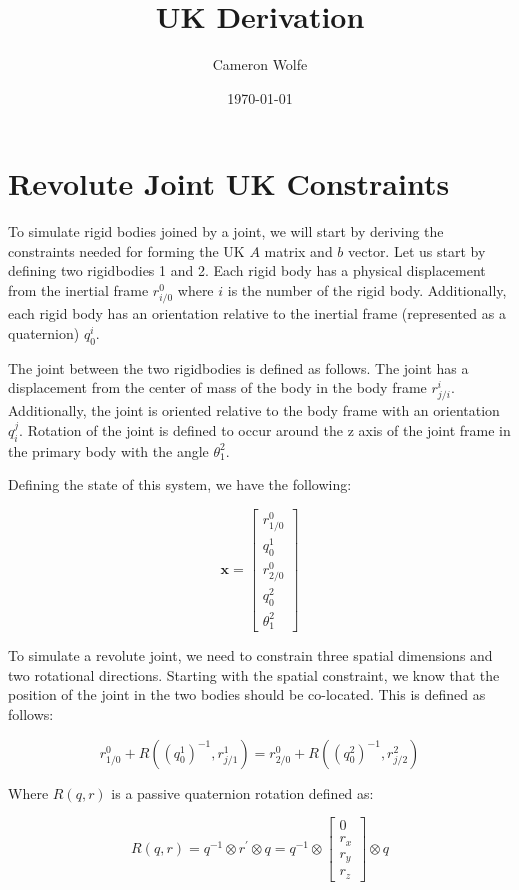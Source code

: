 \documentclass{article}
\title{UK Derivation}
\author{Cameron Wolfe}
\date{\today}
\begin{document}
\section{Revolute Joint UK Constraints}

To simulate rigid bodies joined by a joint, we will start by deriving the constraints needed for forming the UK $A$ matrix and $b$ vector.  Let us start by defining two rigidbodies 1 and 2.  Each rigid body has a physical displacement from the inertial frame $r_{i/0}^0$ where $i$ is the number of the rigid body.  Additionally, each rigid body has an orientation relative to the inertial frame (represented as a quaternion) $q_0^i$.

The joint between the two rigidbodies is defined as follows.  The joint has a displacement from the center of mass of the body in the body frame $r_{j/i}^i$.  Additionally, the joint is oriented relative to the body frame with an orientation $q_i^j$.  Rotation of the joint is defined to occur around the z axis of the joint frame in the primary body with the angle $\theta^2_1$.

Defining the state of this system, we have the following:

\begin{equation}
    \mathbf{x} = \begin{bmatrix}
        r_{1/0}^0 \\
        q_0^1 \\
        r_{2/0}^0 \\
        q_0^2 \\
        \theta_1^2
    \end{bmatrix}
\end{equation}

To simulate a revolute joint, we need to constrain three spatial dimensions and two rotational directions.  Starting with the spatial constraint, we know that the position of the joint in the two bodies should be co-located.  This is defined as follows:

\begin{equation}
    r_{1/0}^0 + R((q_0^1)^{-1}, r_{j/1}^1) = r_{2/0}^0 + R((q_0^2)^{-1}, r_{j/2}^2)
    \label{eq_translation_constraint}
\end{equation}

Where $R(q, r)$ is a passive quaternion rotation defined as:

\begin{equation}
    R(q, r) = q^{-1} \otimes r^\prime \otimes q = q^{-1} \otimes \begin{bmatrix} 0 \\ r_x \\ r_y \\ r_z \end{bmatrix} \otimes q
\end{equation}
\end{document}

